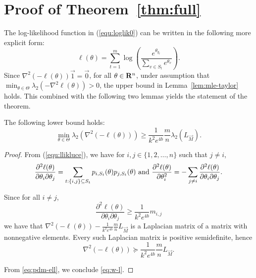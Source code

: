

\section{Proof of Theorem~\ref{thm:full}} \label{sec:proof-full}

The log-likelihood function in (\ref{equ:loglik0}) can be written in the following more explicit form:
\begin{equation}
\ell(\theta) = \sum_{t=1}^m \log\left(\frac{e^{\theta_{y_t}}}{\sum_{v\in S_t}e^{\theta_v}}\right).
\label{equ:llikluce}
\end{equation}
Since $\nabla^2(-\ell(\theta))\vec{1} = \vec{0}$, for all $\theta\in \mathbf{R}^n$, under assumption that $\min_{\theta\in \Theta}\lambda_2 \left(-\nabla^2 \ell (\theta) \right)>0$, the upper bound in Lemma~\ref{lem:mle-taylor} holds. This combined with the following two lemmas yields the statement of the theorem. 


\begin{lemma} The following lower bound holds:
\begin{equation}
\min_{\theta \in \Theta}\lambda_2 \left(\nabla^2 (-\ell (\theta)) \right) \ge \frac{1}{k^2 e^{4b}}\frac{m}{n} \lambda_2 (L_\vec{M}). 
\label{eq:w-l}
\end{equation}
\label{lem:L11}
\end{lemma}

\begin{proof}
From (\ref{equ:llikluce}), we have for $i,j\in \{1,2,\ldots,n\}$ such that $j\neq i$,
$$
\frac{\partial^2 \ell (\theta)}{\partial \theta_i \partial \theta_j} = \sum_{t:\{ i,j\}\subseteq S_t} p_{i,S_t}(\theta)p_{j,S_t}(\theta) 
\hbox{ and }
 \frac{\partial^2 \ell(\theta)}{\partial \theta_i^2} = -\sum_{j\neq i} \frac{\partial^2 \ell (\theta)}{\partial \theta_i \partial \theta_j}.
$$

Since for all $i\neq j$,
$$
\frac{\partial^2 \ell (\theta)}{\partial \theta_i \partial \theta_j} \ge \frac{1}{k^2 e^{4b}}m_{i,j}
$$
we have that $\nabla^2(-\ell (\theta)) -  \frac{1}{k^2 e^{4b}}\frac{m}{n} L_\vec{M}$ is a Laplacian matrix of a matrix with nonnegative elements. Every such Laplacian matrix is positive semidefinite, hence 
\begin{equation}
\nabla^2 (-\ell (\theta)) \succeq \frac{1}{k^2 e^{4b}}\frac{m}{n} L_\vec{M}.
\label{eq:pdm-ell}
\end{equation}

From \eqref{eq:pdm-ell}, we conclude \eqref{eq:w-l}.
\end{proof}


